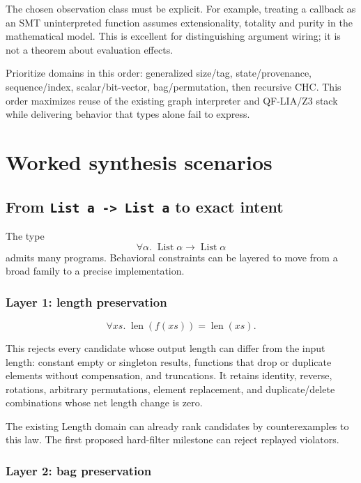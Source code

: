 \documentclass[11pt,oneside]{report}
\begin{document}
The chosen observation class must be explicit. For example, treating a callback as an SMT uninterpreted function assumes extensionality, totality and purity in the mathematical model. This is excellent for distinguishing argument wiring; it is not a theorem about evaluation effects.

\begin{recommendation}
Prioritize domains in this order: generalized size/tag, state/provenance, sequence/index, scalar/bit-vector, bag/permutation, then recursive CHC. This order maximizes reuse of the existing graph interpreter and QF-LIA/Z3 stack while delivering behavior that types alone fail to express.
\end{recommendation}

\chapter{Worked synthesis scenarios}
\label{chap:examples}

\section{From \texttt{List a -> List a} to exact intent}
\label{sec:example-list}

The type
\[
  \forall \alpha.\;\operatorname{List}\alpha\to\operatorname{List}\alpha
\]
admits many programs. Behavioral constraints can be layered to move from a broad family to a precise implementation.

\subsection{Layer 1: length preservation}

\[
  \forall xs.\;\operatorname{len}(f(xs))=\operatorname{len}(xs).
\]

This rejects every candidate whose output length can differ from the input length: constant empty or singleton results, functions that drop or duplicate elements without compensation, and truncations. It retains identity, reverse, rotations, arbitrary permutations, element replacement, and duplicate/delete combinations whose net length change is zero.

The existing Length domain can already rank candidates by counterexamples to this law. The first proposed hard-filter milestone can reject replayed violators.

\subsection{Layer 2: bag preservation}
\end{document}
